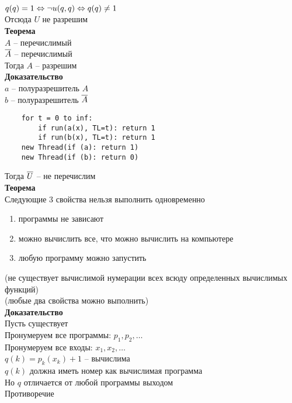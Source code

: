 \documentclass[12pt]{article}
\begin{document}
$q(q) = 1 \Leftrightarrow \lnot u(q,q) \Leftrightarrow q(q) \neq 1$\\
Отсюда $U$ не разрешим\\
\textbf{Теорема}\\
$A$ -- перечислимый\\
$\overline A$ -- перечислимый\\
Тогда $A$ -- разрешим\\
\textbf{Доказательство}\\
$a$ -- полуразрешитель $A$\\
$b$ -- полуразрешитель $\overline A$\\
\begin{lstlisting}
    for t = 0 to inf:
        if run(a(x), TL=t): return 1
        if run(b(x), TL=t): return 1
    new Thread(if (a): return 1)
    new Thread(if (b): return 0)
\end{lstlisting}
Тогда $\overline U$ -- не перечислим\\
\textbf{Теорема}\\
Следующие 3 свойства нельзя выполнить одновременно
\begin{enumerate}
    \item программы не зависают
    \item можно вычислить все, что можно вычислить на компьютере
    \item любую программу можно запустить
\end{enumerate}
(не существует вычислимой нумерации всех всюду определенных вычислимых функций)\\
(любые два свойства можно выполнить)\\
\textbf{Доказательство}\\
Пусть существует\\
Пронумеруем все программы: $p_1, p_2, \ldots$\\
Пронумеруем все входы: $x_1, x_2, \ldots$\\
$q(k) = p_k(x_k)+1$ -- вычислима\\
$q(k)$ должна иметь номер как вычислимая программа\\
Но $q$ отличается от любой программы выходом\\
Противоречие\\
\end{document}
